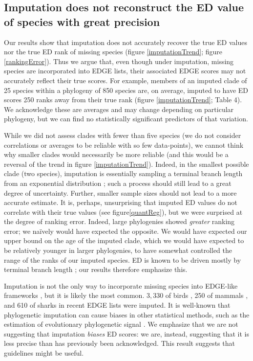 \documentclass[12pt,english]{article}
\begin{document}
\subsection*{Imputation does not reconstruct the ED value of species with great precision}
Our results show that imputation does not accurately recover the true ED values
nor the true ED rank of missing species (figure \ref{imputationTrend}; figure
\ref{rankingError}). Thus we argue that, even though under imputation, missing
species are incorporated into EDGE lists, their associated EDGE scores may not
accurately reflect their true scores. For example, members of an imputed clade
of 25 species within a phylogeny of 850 species are, on average, imputed to have
ED scores 250 ranks away from their true rank (figure \ref{imputationTrend}; Table
4). We acknowledge these are averages and may change depending on particular
phylogeny, but we can find no statistically significant predictors of that
variation.

While we did not assess clades with fewer than five species (we do not consider
correlations or averages to be reliable with so few data-points), we cannot
think why smaller clades would necessarily be more reliable (and this would be a
reversal of the trend in figure \ref{imputationTrend}). Indeed, in the smallest
possible clade (two species), imputation is essentially sampling a terminal
branch length from an exponential distribution \autocite{Kuhn2011}; such a
process should still lead to a great degree of uncertainty. Further, smaller
sample sizes should not lead to a more accurate estimate. It is, perhaps,
unsurprising that imputed ED values do not correlate with their true values (see
figure\ref{quantReg}), but we were surprised at the degree of ranking error.
Indeed, large phylogenies showed \emph{greater} ranking error; we na\"{i}vely
would have expected the opposite. We would have expected our upper bound on the
age of the imputed clade, which we would have expected to be relatively younger
in larger phylogenies, to have somewhat controlled the range of the ranks of our
imputed species. ED is known to be driven mostly by terminal branch length
\autocite{Redding2008, Isaac2007, Steel2007}; our results therefore emphasize
this.

Imputation is not the only way to incorporate missing species into EDGE-like
frameworks \autocite{Gumbs2017, Collen2011}, but it is likely the most common.
$3,330$ of birds \autocite[\textasciitilde30\%;][]{Jetz2014}, 250 of mammals
\autocite[\textasciitilde 5.6\%;][]{Collen2011}, and 610 of sharks
\autocite[\textasciitilde49\%;][]{Stein2018} in recent EDGE lists were imputed.
It is well-known that phylogenetic imputation can cause biases in other
statistical methods, such as the estimation of evolutionary phylogenetic signal
\autocite{Rabosky2014}. We emphasize that we are not suggesting that imputation
\emph{biases} ED scores: we are, instead, suggesting that it is less precise
than has previously been acknowledged. This result suggests that guidelines
might be useful.
\end{document}
